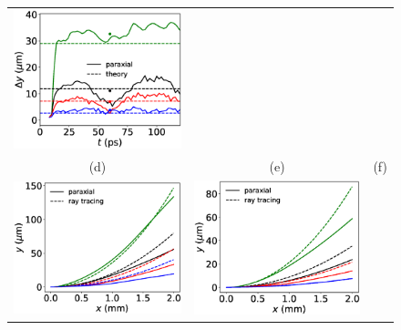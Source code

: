 \documentclass[%
 reprint,
 amsmath,amssymb,
 aps,
]{revtex4-1}
\begin{document}
\begin{figure}
\begin{tabular}{ccc}
\includegraphics[scale=0.32]{Fig2c.eps}\\
(d)&(e)&(f)\\
\includegraphics[scale=0.32]{Fig2d.eps}&
\includegraphics[scale=0.32]{Fig2e.eps}&

\end{tabular}
\end{figure}
\end{document}
